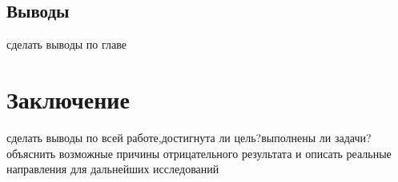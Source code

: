 \documentclass{spbau-diploma}
\begin{document}
\pagebreak
\subsection{Выводы}
сделать выводы по главе
\section*{Заключение}
сделать выводы по всей работе,достигнута ли цель?выполнены ли задачи?объяснить возможные причины отрицательного результата и описать реальные направления для дальнейших исследований






\end{document}
